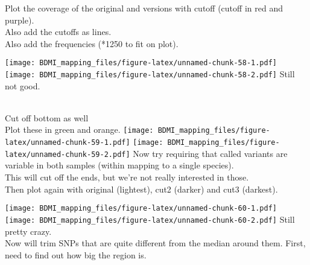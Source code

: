 \documentclass[
]{article}
\newenvironment{Shaded}{\begin{snugshade}}{\end{snugshade}}
\newcommand{\DecValTok}[1]{\textcolor[rgb]{0.00,0.00,0.81}{#1}}
\newcommand{\FunctionTok}[1]{\textcolor[rgb]{0.13,0.29,0.53}{\textbf{#1}}}
\newcommand{\NormalTok}[1]{#1}
\newcommand{\OtherTok}[1]{\textcolor[rgb]{0.56,0.35,0.01}{#1}}
\newcommand{\SpecialCharTok}[1]{\textcolor[rgb]{0.81,0.36,0.00}{\textbf{#1}}}
\begin{document}
\begin{Shaded}
\end{Shaded}

Plot the coverage of the original and versions with cutoff (cutoff in
red and purple).\\
Also add the cutoffs as lines.\\
Also add the frequencies (*1250 to fit on plot).

\texttt{[image: BDMI\_mapping\_files/figure-latex/unnamed-chunk-58-1.pdf]}
\texttt{[image: BDMI\_mapping\_files/figure-latex/unnamed-chunk-58-2.pdf]}
Still not good.\\
\strut \\
Cut off bottom as well\\
Plot these in green and orange.
\texttt{[image: BDMI\_mapping\_files/figure-latex/unnamed-chunk-59-1.pdf]}
\texttt{[image: BDMI\_mapping\_files/figure-latex/unnamed-chunk-59-2.pdf]}
Now try requiring that called variants are variable in both samples
(within mapping to a single species).\\
This will cut off the ends, but we're not really interested in those.\\
Then plot again with original (lightest), cut2 (darker) and cut3
(darkest).

\texttt{[image: BDMI\_mapping\_files/figure-latex/unnamed-chunk-60-1.pdf]}
\texttt{[image: BDMI\_mapping\_files/figure-latex/unnamed-chunk-60-2.pdf]}
Still pretty crazy.\\
Now will trim SNPs that are quite different from the median around them.
First, need to find out how big the region is.
\end{document}
